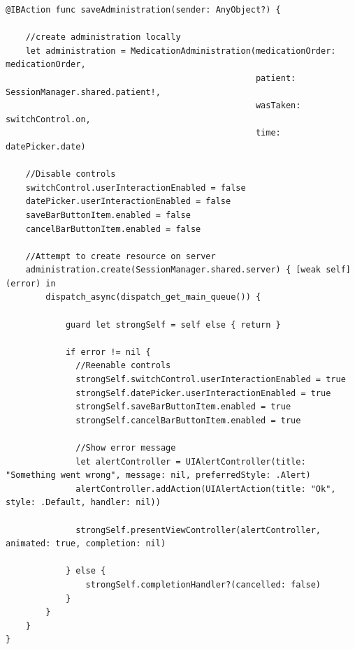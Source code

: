 \documentclass{article}
\begin{document}
\begin{verbatim}
@IBAction func saveAdministration(sender: AnyObject?) {

    //create administration locally
    let administration = MedicationAdministration(medicationOrder: medicationOrder,
                                                  patient: SessionManager.shared.patient!,
                                                  wasTaken: switchControl.on,
                                                  time: datePicker.date)

    //Disable controls
    switchControl.userInteractionEnabled = false
    datePicker.userInteractionEnabled = false
    saveBarButtonItem.enabled = false
    cancelBarButtonItem.enabled = false

    //Attempt to create resource on server
    administration.create(SessionManager.shared.server) { [weak self] (error) in
        dispatch_async(dispatch_get_main_queue()) {

            guard let strongSelf = self else { return }

            if error != nil {
              //Reenable controls
              strongSelf.switchControl.userInteractionEnabled = true
              strongSelf.datePicker.userInteractionEnabled = true
              strongSelf.saveBarButtonItem.enabled = true
              strongSelf.cancelBarButtonItem.enabled = true

              //Show error message
              let alertController = UIAlertController(title: "Something went wrong", message: nil, preferredStyle: .Alert)
              alertController.addAction(UIAlertAction(title: "Ok", style: .Default, handler: nil))

              strongSelf.presentViewController(alertController, animated: true, completion: nil)

            } else {
                strongSelf.completionHandler?(cancelled: false)
            }
        }
    }
}
\end{verbatim}



\end{document}
